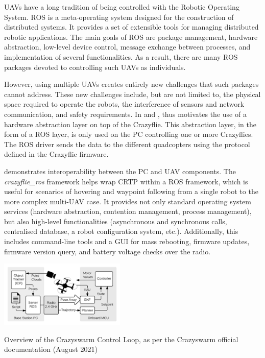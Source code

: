 UAVs have a long tradition of being controlled with the Robotic Operating System. ROS is a meta-operating system designed for the construction of distributed systems. It provides a set of extensible tools for managing distributed robotic applications.
The main goals of ROS are package management, hardware abstraction, low-level device control, message exchange between processes, and implementation of several functionalities. As a result, there are many ROS packages devoted to controlling such UAVs as individuals. 

However, using multiple UAVs creates entirely new challenges that such packages cannot address. These new challenges include, but are not limited to, the physical space required to operate the robots, the interference of sensors and network communication, and safety requirements. In \cite{hönig_ayanian_2020} and \cite{phan_hönig_ayanian_2018},  thus motivates the use of a hardware abstraction layer on top of the Crazyflie. This abstraction layer, in the form of a ROS layer, is only used on the PC controlling one or more Crazyflies. The ROS driver sends the data to the different quadcopters using the protocol defined in the Crazyflie firmware.

\cite{hönig_ayanian_2020} \hspace*{0.3cm} \textit{} \hspace*{0.5cm} 
demonstrates interoperability between the PC and UAV components.  The \textit{crazyflie\_ros} framework helps wrap CRTP within a ROS framework, which is useful for scenarios of hovering and waypoint following from a single robot to the more complex multi-UAV case. It provides not only standard operating system services (hardware abstraction, contention management, process management), but also high-level functionalities (asynchronous and synchronous calls, centralised database, a robot configuration system, etc.). Additionally, this includes command-line tools and a GUI for mass rebooting, firmware updates, firmware version query, and battery voltage checks over the radio.

\begin{marginfigure}%
  \includegraphics[width=6cm, center]{images/testbed/controlloop_bw.png}
  \caption{Overview of the Crazyswarm Control Loop, as per the Crazyswarm official documentation (August 2021) \cite{crazyswarm_docs}}
\end{marginfigure}

